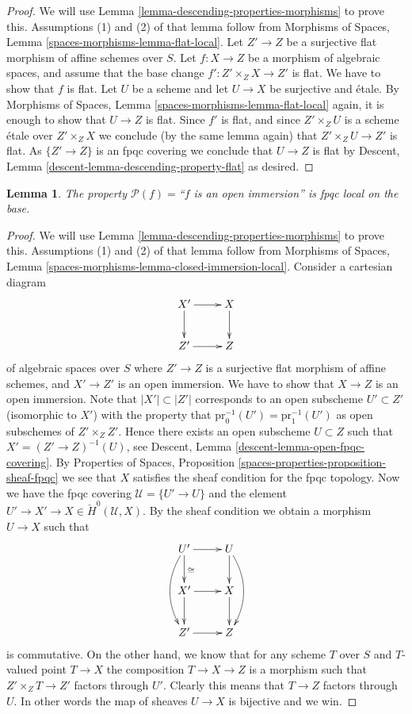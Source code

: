 \documentclass{stacks-project}
\theoremstyle{plain}
\newtheorem{lemma}[subsection]{Lemma}
\theoremstyle{definition}
\theoremstyle{remark}
\numberwithin{equation}{subsection}
\begin{document}
\begin{proof}
We will use
Lemma \ref{lemma-descending-properties-morphisms}
to prove this. Assumptions (1) and (2) of that lemma follow from
Morphisms of Spaces,
Lemma \ref{spaces-morphisms-lemma-flat-local}.
Let $Z' \to Z$ be a surjective flat morphism of affine schemes over $S$.
Let $f : X \to Z$ be a morphism of algebraic spaces, and assume
that the base change $f' : Z' \times_Z X \to Z'$ is flat.
We have to show that $f$ is flat. Let $U$ be a scheme
and let $U \to X$ be surjective and \'etale. By
Morphisms of Spaces,
Lemma \ref{spaces-morphisms-lemma-flat-local}
again, it is enough to show that $U \to Z$ is flat.
Since $f'$ is flat, and since $Z' \times_Z U$ is a
scheme \'etale over $Z' \times_Z X$ we conclude (by the same lemma again) that
$Z' \times_Z U \to Z'$ is flat.
As $\{Z' \to Z\}$ is an fpqc covering we conclude that
$U \to Z$ is flat by
Descent, Lemma \ref{descent-lemma-descending-property-flat}
as desired.
\end{proof}

\begin{lemma}
\label{lemma-descending-property-open-immersion}
The property $\mathcal{P}(f) =$``$f$ is an open immersion''
is fpqc local on the base.
\end{lemma}

\begin{proof}
We will use
Lemma \ref{lemma-descending-properties-morphisms}
to prove this. Assumptions (1) and (2) of that lemma follow from
Morphisms of Spaces,
Lemma \ref{spaces-morphisms-lemma-closed-immersion-local}.
Consider a cartesian diagram
$$
\xymatrix{
X' \ar[r] \ar[d] & X \ar[d] \\
Z' \ar[r] & Z
}
$$
of algebraic spaces over $S$
where $Z' \to Z$ is a surjective flat morphism of affine schemes,
and $X' \to Z'$ is an open immersion. We have to show that $X \to Z$
is an open immersion. Note that $|X'| \subset |Z'|$ corresponds to an
open subscheme $U' \subset Z'$ (isomorphic to $X'$)
with the property that $\text{pr}_0^{-1}(U') = \text{pr}_1^{-1}(U')$
as open subschemes of $Z' \times_Z Z'$. Hence there exists an open
subscheme $U \subset Z$ such that $X' = (Z' \to Z)^{-1}(U)$, see
Descent, Lemma \ref{descent-lemma-open-fpqc-covering}.
By Properties of Spaces,
Proposition \ref{spaces-properties-proposition-sheaf-fpqc}
we see that $X$ satisfies the sheaf condition for the fpqc topology.
Now we have the fpqc covering $\mathcal{U} = \{U' \to U\}$
and the element $U' \to X' \to X \in \check{H}^0(\mathcal{U}, X)$.
By the sheaf condition we obtain a morphism $U \to X$ such that
$$
\xymatrix{
U' \ar[r] \ar[d]^{\cong} \ar@/_3ex/[dd] & U \ar[d] \ar@/^3ex/[dd] \\
X' \ar[r] \ar[d] & X \ar[d] \\
Z' \ar[r] & Z
}
$$
is commutative. On the other hand, we know that for any scheme $T$ over $S$
and $T$-valued point $T \to X$ the composition $T \to X \to Z$ is a
morphism such that $Z' \times_Z T \to Z'$ factors through $U'$. Clearly
this means that $T \to Z$ factors through $U$. In other words the map
of sheaves $U \to X$ is bijective and we win.
\end{proof}
\end{document}
